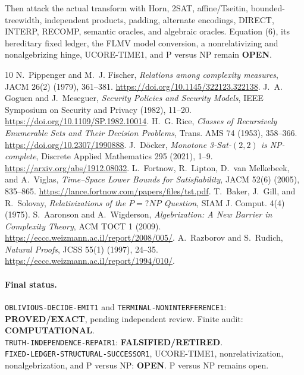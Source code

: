 \documentclass[11pt]{article}
\newcommand{\EXACT}{\textbf{PROVED/EXACT}}
\newcommand{\OPEN}{\textbf{OPEN}}
\newcommand{\RETIRED}{\textbf{FALSIFIED/RETIRED}}
\newcommand{\COMP}{\textbf{COMPUTATIONAL}}
\begin{document}
Then attack the actual transform with Horn, 2SAT, affine/Tseitin,
bounded-treewidth, independent products, padding, alternate encodings,
DIRECT, INTERP, RECOMP, semantic oracles, and algebraic oracles.  Equation
(6), its hereditary fixed ledger, the FLMV model conversion, a
nonrelativizing and nonalgebrizing hinge, UCORE-TIME1, and P versus NP remain
\OPEN.

\begin{thebibliography}{10}
 N.~Pippenger and M.~J. Fischer,
\emph{Relations among complexity measures}, JACM 26(2) (1979), 361--381.
\url{https://doi.org/10.1145/322123.322138}.
 J.~A. Goguen and J.~Meseguer,
\emph{Security Policies and Security Models}, IEEE Symposium on Security and
Privacy (1982), 11--20. \url{https://doi.org/10.1109/SP.1982.10014}.
 H.~G. Rice,
\emph{Classes of Recursively Enumerable Sets and Their Decision Problems},
Trans. AMS 74 (1953), 358--366. \url{https://doi.org/10.2307/1990888}.
 J.~D\"ocker,
\emph{Monotone 3-Sat-$(2,2)$ is NP-complete}, Discrete Applied Mathematics
295 (2021), 1--9. \url{https://arxiv.org/abs/1912.08032}.
 L.~Fortnow, R.~Lipton, D.~van Melkebeek, and A.~Viglas,
\emph{Time--Space Lower Bounds for Satisfiability}, JACM 52(6) (2005),
835--865. \url{https://lance.fortnow.com/papers/files/tst.pdf}.
 T.~Baker, J.~Gill, and R.~Solovay,
\emph{Relativizations of the $P=?NP$ Question}, SIAM J. Comput. 4(4) (1975).
 S.~Aaronson and A.~Wigderson,
\emph{Algebrization: A New Barrier in Complexity Theory}, ACM TOCT 1 (2009).
\url{https://eccc.weizmann.ac.il/report/2008/005/}.
 A.~Razborov and S.~Rudich,
\emph{Natural Proofs}, JCSS 55(1) (1997), 24--35.
\url{https://eccc.weizmann.ac.il/report/1994/010/}.
\end{thebibliography}

\paragraph{Final status.}
\texttt{OBLIVIOUS-DECIDE-EMIT1} and
\texttt{TERMINAL-NONINTERFERENCE1}: \EXACT, pending independent review.
Finite audit: \COMP.\\
\texttt{TRUTH-INDEPENDENCE-REPAIR1}: \RETIRED.\\
\texttt{FIXED-LEDGER-STRUCTURAL-SUCCESSOR1}, UCORE-TIME1,
nonrelativization, nonalgebrization, and P versus NP: \OPEN.
P versus NP remains open.

\end{document}

